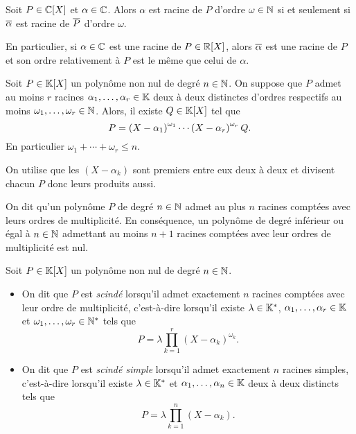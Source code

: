 \documentclass{magnolia}
\begin{document}
\begin{proposition}
Soit $P\in\polyC$ et $\alpha\in\mathbb{C}$. Alors $\alpha$ est racine de $P$ d'ordre $\omega\in\mathbb{N}$
si et seulement si $\overline{\alpha}$ est racine de $\overline{P}$ d'ordre $\omega$.
\end{proposition}

\begin{remarqueUnique}
\remarque En particulier, si $\alpha\in\mathbb{C}$ est une racine de $P\in\polyR$, alors $\overline{\alpha}$ est
  une racine de $P$ et son ordre relativement à $P$ est le même que celui de $\alpha$.
\end{remarqueUnique}

\begin{proposition}
Soit $P\in\polyK$ un polynôme non nul de degré $n\in\mathbb{N}$. On suppose que $P$ admet
au moins $r$ racines $\alpha_1,\ldots,\alpha_r\in\mathbb{K}$ deux à deux distinctes d'ordres respectifs au moins $\omega_1,\ldots,\omega_r\in\mathbb{N}$.
Alors, il existe $Q\in\polyK$ tel que
\[P=\left(X-\alpha_1\right)^{\omega_1}\cdots\left(X-\alpha_r\right)^{\omega_r} Q.\]
En particulier $\omega_1+\cdots+\omega_r\leq n$. \end{proposition}

\begin{preuve}
On utilise que les $(X-\alpha_{k})$ sont premiers entre eux deux à deux et divisent chacun $P$ donc leurs produits aussi.
\end{preuve}

\begin{remarques}
\remarque On dit qu'un polynôme $P$  de degré $n\in\mathbb{N}$ admet au plus $n$ racines comptées avec leurs ordres de multiplicité.
\remarque En conséquence, un polynôme de degré inférieur ou égal à $n\in\mathbb{N}$ admettant au moins $n+1$ racines comptées
  avec leur ordres de multiplicité est nul.
\end{remarques}

\begin{definition}
Soit $P\in\polyK$ un polynôme non nul de degré $n\in\mathbb{N}$.
\begin{itemize}
\item On dit que $P$ est \emph{scindé} lorsqu'il admet exactement $n$ racines comptées avec
  leur ordre de multiplicité, c'est-à-dire lorsqu'il existe $\lambda\in\mathbb{K}^*$,
  $\alpha_1,\ldots,\alpha_r\in\mathbb{K}$ et $\omega_1,\ldots,\omega_r\in{\mathbb{N}^*}$ tels que
  \[P=\lambda\prod_{k=1}^r(X-\alpha_k)^{\omega_k}.\]
\item On dit que $P$ est \emph{scindé simple} lorsqu'il admet exactement $n$ racines simples,
  c'est-à-dire lorsqu'il existe
  $\lambda\in\mathbb{K}^*$ et $\alpha_1,\ldots,\alpha_n\in\mathbb{K}$ deux à deux distincts tels que
  \[P=\lambda\prod_{k=1}^n(X-\alpha_k).\]
\end{itemize}
\end{definition}
\end{document}
